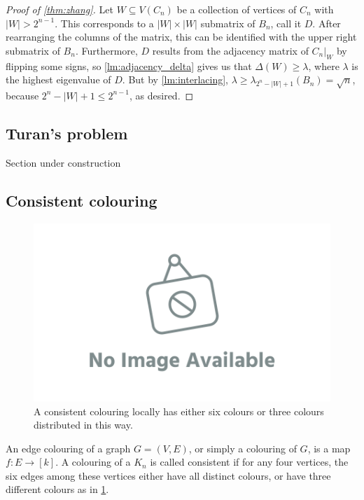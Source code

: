 \documentclass[12pt]{amsart}
\theoremstyle{definition}
\begin{document}
\begin{proof}[Proof of \cref{thm:zhang}]
Let $W \subseteq V(C_n)$ be a collection of vertices of $C_n$ with $|W| > 2^{n-1}$.
This corresponds to a $|W|\times |W|$ submatrix of $B_n$, call it $D$.
After rearranging the columns of the matrix, this can be identified with the upper right submatrix of $B_n$.
Furthermore, $D$ results from the adjacency matrix of $C_n|_W$ by flipping some signs, so \cref{lm:adjacency_delta} gives us that $\Delta(W) \geq \lambda$, where $\lambda $ is the highest eigenvalue of $D$.
But by \cref{lm:interlacing}, $\lambda \geq \lambda_{2^n - |W| + 1}(B_n) = \sqrt{n}$, because $2^n - |W| + 1 \leq 2^{n-1}$, as desired.
\end{proof}

\subsection{Turan's problem}

Section under construction

\subsection{Consistent colouring}



\begin{figure}[h]
\includegraphics[scale=.1]{../imgs/ina.png}%
\caption{A consistent colouring locally has either six colours or three colours distributed in this way.\label{fig:consistent_colouring}}
\end{figure}


An edge colouring of a graph $G = (V, E)$, or simply a colouring of $G$, is a map $f:E \to [k]$.
A colouring of a $K_n$ is called consistent if for any four vertices, the six edges among these vertices either have all distinct colours, or have three different colours as in \cref{fig:consistent_colouring}.
\end{document}
